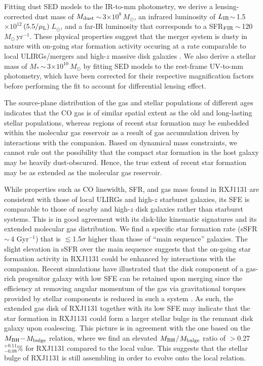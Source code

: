 \documentclass[]{emulateapj}
\newcommand{\Msun}{\mbox{$M_{\odot}$}\xspace}
\newcommand{\Lsun}{\mbox{$L_{\odot}$}\xspace}
\newcommand{\LIR}{\mbox{$L_{\rm IR}$}\xspace}
\newcommand{\pmOne}{\mbox{$^{-1}$}\xspace}
\newcommand{\sfrU}{\mbox{\Msun\,yr$^{-1}$}\xspace}
\newcommand{\E}[1]{\mbox{$\times10^{#1}$}}
\newcommand{\petm}[2]{$^{+#1}_{-#2}$}
\newcommand{\ssim}{\,$\sim$\,}
\newcommand{\SF}{star formation\xspace}
\newcommand{\SB}{starburst\xspace}
\begin{document}
Fitting dust SED models to the IR-to-mm photometry, we derive
a lensing-corrected dust mass of $M_{\rm dust}$\ssim3\E{8}\,\Msun,
an infrared luminosity of \LIR$\sim$\,1.5\E{12}\,$(5.5/\mu_{\rm L})$\,\Lsun,
and a far-IR luminosity that corresponds to a SFR$_{\rm FIR}$\ssim120\,\sfrU.
These physical properties suggest that the merger system is dusty in nature with on-going \SF activity occuring
at a rate comparable to local ULIRGs/mergers and high-$z$ massive disk galaxies \citep{dacunha10a, Daddi10a}.
We also derive a stellar mass of $M_{*}$\ssim3\E{10}\,\Msun by fitting SED models to the
rest-frame UV-to-mm photometry, which have been corrected for their respective magnification factors before performing the fit to account for differential lensing effect.

The source-plane distribution of the gas and stellar populations of different ages
indicates that the CO gas is of similar spatial extent as the old and long-lasting stellar populations,
whereas regions of recent \SF may be embedded within the molecular gas reservoir as a result of
gas accumulation driven by interactions with the companion.
Based on dynamical mass constraints, we cannot rule out the possibility that the
compact \SF in the host galaxy
may be heavily dust-obscured.
Hence, the true extent of recent \SF may be as extended as the molecular gas
reservoir.

While properties such as CO linewidth, SFR, and gas mass found in RXJ1131
are consistent with those of local ULIRGs and high-$z$ starburst galaxies,
its SFE is comparable to those of nearby and high-$z$ disk galaxies rather than
\SB systems. This is in good agreement with its disk-like kinematic signatures and its extended molecular gas distribution.
We find a specific \SF rate (sSFR\ssim4 Gyr\pmOne) that is $\lesssim$1.5$\sigma$ higher than those of ``main sequence'' galaxies.
The slight elevation in sSFR over the main sequence suggests that
the on-going star formation activity in RXJ1131 could be enhanced by interactions with the companion.
Recent simulations have illustrated that the disk component of a gas-rich
progenitor galaxy with low SFE can be
retained upon merging since the efficiency at removing angular momentum of the gas via
gravitational torques provided by stellar components is reduced in such a system \citep{Springel05a, Robertson06a, Hopkins09a}.
As such, the extended gas disk of RXJ1131 together with its low SFE may indicate
that the \SF in RXJ1131 could form a
larger stellar bulge in the remnant disk galaxy upon coalescing.
This picture is in agreement with the one based on the \mbox{$M_{\rm BH}$$-$$M_{\rm bulge}$} relation,
where we find an elevated \mbox{$M_{\rm BH}$$/$$M_{\rm bulge}$} ratio of $>$0.27\petm{0.11}{0.08}\% for
RXJ1131 compared to the local value.
This suggests that the stellar bulge of RXJ1131 is still assembling in order to evolve onto the local relation.
\end{document}
